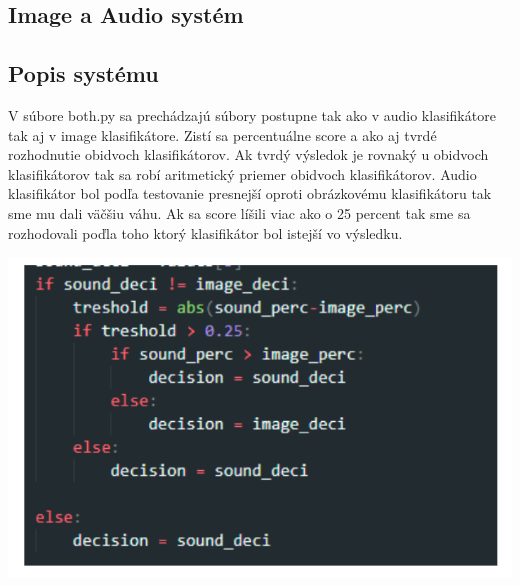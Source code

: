 \documentclass{article}
\begin{document}
\begin{flushleft}
\section{Image a Audio systém}
\subsection{Popis systému}
\Large{V súbore both.py sa prechádzajú  súbory postupne tak ako v audio klasifikátore tak aj v image klasifikátore. Zistí sa percentuálne score a ako aj tvrdé rozhodnutie obidvoch klasifikátorov. Ak tvrdý výsledok je rovnaký u obidvoch klasifikátorov  tak sa robí aritmetický priemer obidvoch klasifikátorov. Audio klasifikátor bol podľa testovanie presnejší oproti obrázkovému klasifikátoru tak sme mu dali väčšiu váhu. Ak sa score líšili viac ako o 25 percent tak sme sa rozhodovali poďla toho ktorý klasifikátor bol istejší vo výsledku. }
\end{flushleft}
\center\includegraphics[width=0.9\linewidth]{./image9.png}\\
\end{document}
